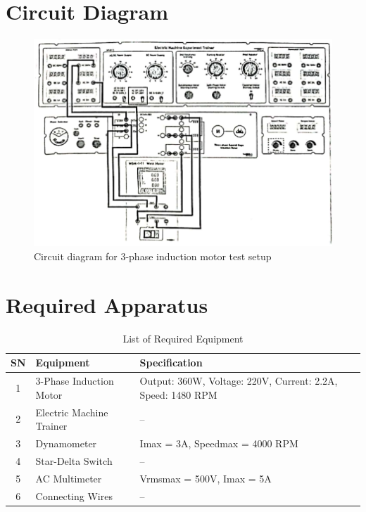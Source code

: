 \documentclass[a4paper,12pt]{article}
\begin{document}
	\section{Circuit Diagram}
	\begin{figure}[H]
		\centering
\includegraphics[width=0.7\linewidth]{Images/3}
		\caption{Circuit diagram for 3-phase induction motor test setup}
		\label{fig:circuit}
	\end{figure}
	
	\section{Required Apparatus}
	\begin{table}[H]
		\centering
		\caption{List of Required Equipment}
		\begin{tabular}{|c|p{5.5cm}|p{6cm}|}
			\hline
			\textbf{SN} & \textbf{Equipment} & \textbf{Specification} \\
			\hline
			1 & 3-Phase Induction Motor & Output: 360W, Voltage: 220V, Current: 2.2A, Speed: 1480 RPM \\
			\hline
			2 & Electric Machine Trainer & -- \\
			\hline
			3 & Dynamometer & Imax = 3A, Speedmax = 4000 RPM \\
			\hline
			4 & Star-Delta Switch & -- \\
			\hline
			5 & AC Multimeter & Vrmsmax = 500V, Imax = 5A \\
			\hline
			6 & Connecting Wires & -- \\
			\hline
		\end{tabular}
	\end{table}
	
\end{document}
